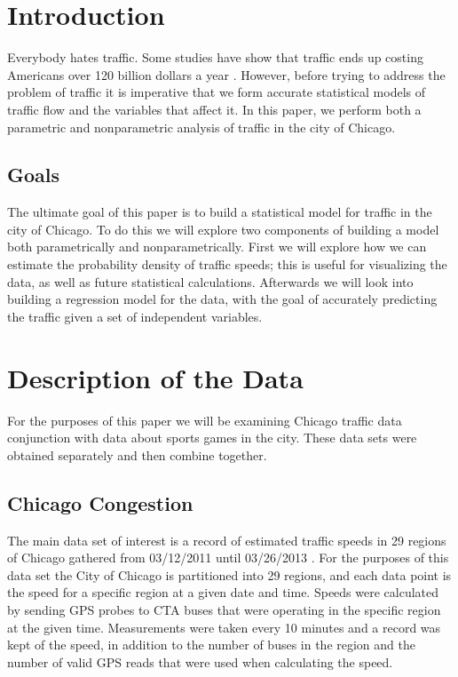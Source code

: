 \documentclass[12pt]{article}
\begin{document}
\maketitle
\section{Introduction}
Everybody hates traffic. Some studies have show that traffic ends up costing Americans over 120 billion dollars a year \cite{costoftraffic}. However, before trying to address the problem of traffic it is imperative that we form accurate statistical models of traffic flow and the variables that affect it. In this paper, we perform both a parametric and nonparametric analysis of traffic in the city of Chicago.
\subsection{Goals}
The ultimate goal of this paper is to build a statistical model for traffic in the city of Chicago. To do this we will explore two components of building a model both parametrically and nonparametrically. First we will explore how we can estimate the probability density of traffic speeds; this is useful for visualizing the data, as well as future statistical calculations. Afterwards we will look into building a regression model for the data, with the goal of accurately predicting the traffic given a set of independent variables.
\section{Description of the Data}
For the purposes of this paper we will be examining Chicago traffic data conjunction with data about sports games in the city. These data sets were obtained separately and then combine together.
\subsection{Chicago Congestion}
The main data set of interest is a record of estimated traffic speeds in 29 regions of Chicago gathered from 03/12/2011 until 03/26/2013 \cite{regiondataset}. For the purposes of this data set the City of Chicago is partitioned into 29 regions, and each data point is the speed for a specific region at a given date and time. Speeds were calculated by sending GPS probes to CTA buses that were operating in the specific region at the given time. Measurements were taken every 10 minutes and a record was kept of the speed, in addition to the number of buses in the region and the number of valid GPS reads that were used when calculating the speed.
\end{document}
